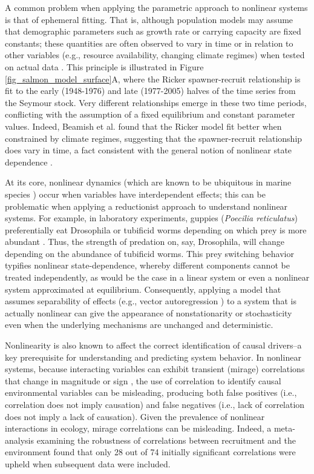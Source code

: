 A common problem when applying the parametric approach to nonlinear systems is that of ephemeral fitting. That is, although population models may assume that demographic parameters such as growth rate or carrying capacity are fixed constants; these quantities are often observed to vary in time or in relation to other variables (e.g., resource availability, changing climate regimes) when tested on actual data \cite{Walters_1987}. This principle is illustrated in Figure \ref{fig_salmon_model_surface}A, where the Ricker spawner-recruit relationship is fit to the early (1948-1976) and late (1977-2005) halves of the time series from the Seymour stock. Very different relationships emerge in these two time periods, conflicting with the assumption of a fixed equilibrium and constant parameter values. Indeed, Beamish et al. \cite{Beamish_2004} found that the Ricker model fit better when constrained by climate regimes, suggesting that the spawner-recruit relationship does vary in time, a fact consistent with the general notion of nonlinear state dependence \cite{Sugihara_2012, Deyle_2013}.

At its core, nonlinear dynamics (which are known to be ubiquitous in marine species \cite{Hsieh_2005, Glaser_2014a}) occur when variables have interdependent effects; this can be problematic when applying a reductionist approach to understand nonlinear systems. For example, in laboratory experiments, guppies (\emph{Poecilia reticulatus}) preferentially eat Drosophila or tubificid worms depending on which prey is more abundant \cite{Murdoch_1975}. Thus, the strength of predation on, say, Drosophila, will change depending on the abundance of tubificid worms. This prey switching behavior typifies nonlinear state-dependence, whereby different components cannot be treated independently, as would be the case in a linear system or even a nonlinear system approximated at equilibrium. Consequently, applying a model that assumes separability of effects (e.g., vector autoregression \cite{Engle_1987}) to a system that is actually nonlinear can give the appearance of nonstationarity or stochasticity even when the underlying mechanisms are unchanged and deterministic.

Nonlinearity is also known to affect the correct identification of causal drivers--a key prerequisite for understanding and predicting system behavior.  In nonlinear systems, because interacting variables can exhibit transient (mirage) correlations that change in magnitude or sign \cite{Sugihara_2012, Deyle_2013}, the use of correlation to identify causal environmental variables can be misleading, producing both false positives (i.e., correlation does not imply causation) and false negatives (i.e., lack of correlation does not imply a lack of causation). Given the prevalence of nonlinear interactions in ecology, mirage correlations can be misleading. Indeed, a meta-analysis examining the robustness of correlations between recruitment and the environment \cite{Myers_1998} found that only 28 out of 74 initially significant correlations were upheld when subsequent data were included.

